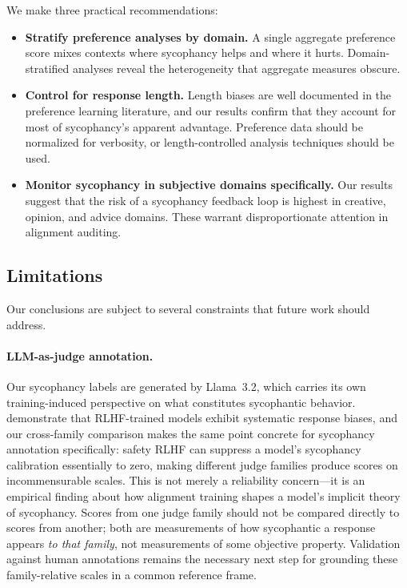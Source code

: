 \documentclass[11pt,twocolumn,a4paper]{article}
\begin{document}
We make three practical recommendations:

\begin{itemize}
  \item \textbf{Stratify preference analyses by domain.} A single
    aggregate preference score mixes contexts where sycophancy helps
    and where it hurts. Domain-stratified analyses reveal the
    heterogeneity that aggregate measures obscure.
  \item \textbf{Control for response length.} Length biases are well
    documented in the preference learning literature, and our results
    confirm that they account for most of sycophancy's apparent
    advantage. Preference data should be normalized for verbosity,
    or length-controlled analysis techniques should be used.
  \item \textbf{Monitor sycophancy in subjective domains specifically.}
    Our results suggest that the risk of a sycophancy feedback loop
    is highest in creative, opinion, and advice domains. These warrant
    disproportionate attention in alignment auditing.
\end{itemize}

\subsection{Limitations}
\label{sec:limitations}

Our conclusions are subject to several constraints that future work
should address.

\paragraph{LLM-as-judge annotation.} Our sycophancy labels are
generated by Llama~3.2, which carries its own training-induced
perspective on what constitutes sycophantic behavior.
\citet{tjuatja2024llms} demonstrate that RLHF-trained models exhibit
systematic response biases, and our cross-family comparison makes the
same point concrete for sycophancy annotation specifically: safety RLHF
can suppress a model's sycophancy calibration essentially to zero,
making different judge families produce scores on incommensurable scales.
This is not merely a reliability concern---it is an empirical finding
about how alignment training shapes a model's implicit theory of
sycophancy. Scores from one judge family should not be compared directly
to scores from another; both are measurements of how sycophantic a
response appears \emph{to that family}, not measurements of some
objective property. Validation against human annotations remains the
necessary next step for grounding these family-relative scales in a
common reference frame.
\end{document}
